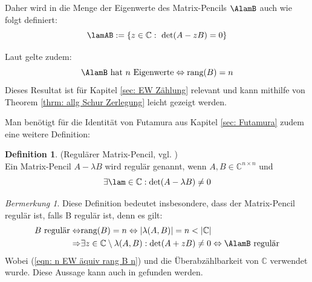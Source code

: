 \documentclass[a4paper,12pt]{report}
\newcommand{\C}{\mathbb C}
\newcommand{\rang}{\text{rang}}
\newcommand{\Cnn}{\C^{n\times n}}
\newcommand{\1}{\mathds{1}}
\theoremstyle{plain} %
\theoremstyle{definition} %
\newtheorem{definition}[theorem]{Definition}
\theoremstyle{remark}
\newtheorem{remark}[theorem]{Bermerkung}
\begin{document}
            Daher wird in \cite[S. 375]{matrixGolub} die Menge der Eigenwerte des Matrix-Pencils $\AlamB$ auch wie folgt definiert:
            \begin{equation}
                  \label{def: EW Pencil}
                  \lamAB:=\{z\in\C:\ \det(A - zB) = 0\}
            \end{equation}

            Laut \cite[S. 375]{matrixGolub} gelte zudem:
            \begin{equation}
                  \label{eqn: n EW äquiv rang B n}
                  \AlamB \text{ hat }n\text{ Eigenwerte}\Leftrightarrow \rang(B)=n
            \end{equation}
            Dieses Resultat ist für Kapitel \ref{sec: EW Zählung} relevant und kann mithilfe von Theorem \ref{thrm: allg Schur Zerlegung} leicht gezeigt werden.

            Man benötigt für die Identität von Futamura aus Kapitel \ref{sec: Futamura} zudem eine weitere Definition:
            \begin{definition}(Regulärer Matrix-Pencil, vgl. \cite[S. 376]{regularMatrixPencil})\\
                  \label{def: regulärer Pencil}
                  Ein Matrix-Pencil $A-\lambda B$ wird regulär genannt, wenn $A,B\in \Cnn$ und
                  $$\exists \lam\in\C:\det(A-\lambda B)\ne 0$$ 
            \end{definition}

            \begin{remark}
                  \label{bem: B reg impl pencil reg}
                  Diese Definition bedeutet insbesondere, dass der Matrix-Pencil regulär ist, falls B regulär ist, denn es gilt:
                  \begin{align*}
                        B\text{ regulär} \Leftrightarrow & \rang(B)=n\Leftrightarrow |\lambda(A,B)| = n<|\C|\\
                        \Rightarrow & \exists z\in\C\setminus\lambda(A,B): \det(A+zB) \ne 0 \Leftrightarrow \AlamB \text{ regulär}
                  \end{align*}
                  Wobei (\ref{eqn: n EW äquiv rang B n}) und die Überabzählbarkeit von $\C$ verwendet wurde.
                  Diese Aussage kann auch in \cite[S. 376]{regularMatrixPencil} gefunden werden.
            \end{remark}
            
\end{document}
